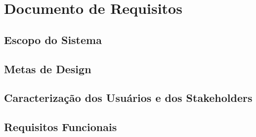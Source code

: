 \documentclass[12pt, a4paper, oneside]{abntex2}
\begin{document}
\chapter{Documento de Requisitos}

\section{Escopo do Sistema}
\label{sec:escopo}
\lipsum[7]

\section{Metas de Design}
\label{sec:metas_design}
\lipsum[8]

\section{Caracterização dos Usuários e dos Stakeholders}
\label{sec:caracterizacao_usuarios}
\lipsum[9]

\section{Requisitos Funcionais}
\label{sec:requisitos_funcionais}

\lipsum[10]
\end{document}
